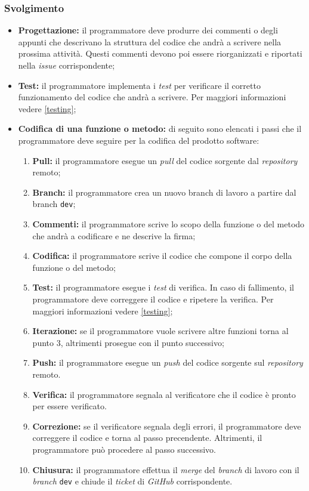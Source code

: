 \subsubsection*{Svolgimento}
\begin{itemize}
	\item \textbf{Progettazione:} il programmatore deve produrre dei commenti o degli appunti che descrivano la struttura del codice che andrà a scrivere nella prossima attività. 
		Questi commenti devono poi essere riorganizzati e riportati nella \textit{issue\g} corrispondente;
	\item \textbf{Test:} il programmatore implementa i \textit{test} per verificare il corretto funzionamento del codice che andrà a scrivere.
		Per maggiori informazioni vedere \cref{testing};
	\item \textbf{Codifica di una funzione o metodo:} di seguito sono elencati i passi che il programmatore deve seguire per la codifica del prodotto software:
		\begin{enumerate}
			\item \textbf{Pull:} il programmatore esegue un \textit{pull} del codice sorgente dal \textit{repository\g} remoto;
			\item \textbf{Branch:} il programmatore crea un nuovo branch di lavoro a partire dal branch \texttt{dev};
			\item \textbf{Commenti:} il programmatore scrive lo scopo della funzione o del metodo che andrà a codificare e ne descrive la firma;
			\item \textbf{Codifica:} il programmatore scrive il codice che compone il corpo della funzione o del metodo;
			\item \textbf{Test:} il programmatore esegue i \textit{test} di verifica.
			In caso di fallimento, il programmatore deve correggere il codice e ripetere la verifica.
			Per maggiori informazioni vedere \cref{testing};
			\item \textbf{Iterazione:} se il programmatore vuole scrivere altre funzioni torna al punto 3, altrimenti prosegue con il punto successivo;
			\item \textbf{Push:} il programmatore esegue un \textit{push} del codice sorgente sul \textit{repository\g} remoto.
			\item \textbf{Verifica:} il programmatore segnala al verificatore che il codice è pronto per essere verificato.
			\item \textbf{Correzione:} se il verificatore segnala degli errori, il programmatore deve correggere il codice e torna al passo precendente. 
			Altrimenti, il programmatore può procedere al passo successivo.
			\item \textbf{Chiusura:} il programmatore effettua il \textit{merge} del \textit{branch} di lavoro con il \textit{branch} \texttt{dev} e chiude il \textit{ticket} di \textit{GitHub\g} corrispondente.
		\end{enumerate}
\end{itemize}

